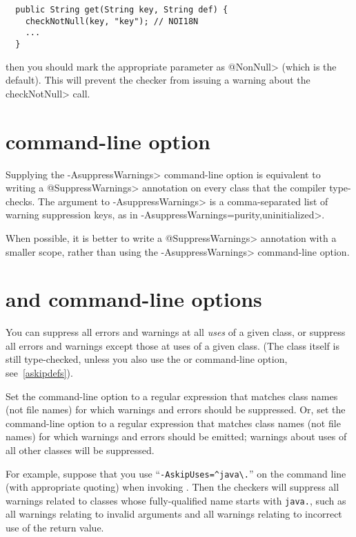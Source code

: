 \begin{Verbatim}
  public String get(String key, String def) {
    checkNotNull(key, "key"); // NOI18N
    ...
  }
\end{Verbatim}

\noindent
then you should mark the appropriate parameter as \<@NonNull> (which is the
default).  This will prevent the checker from issuing a warning about the
\<checkNotNull> call.



\section{ command-line option\label{suppresswarnings-command-line}}

Supplying the \<-AsuppressWarnings> command-line option is equivalent to
writing a \<@SuppressWarnings> annotation on every class that the compiler
type-checks.  The argument to \<-AsuppressWarnings> is a comma-separated
list of warning suppression keys, as in
\<-AsuppressWarnings=purity,uninitialized>.

When possible, it is better to write a \<@SuppressWarnings> annotation with a
smaller scope, rather than using the \<-AsuppressWarnings> command-line option.


\section{ and  command-line options\label{askipuses}}

You can suppress all errors and warnings at all \emph{uses} of a given
class, or suppress all errors and warnings except those at uses of a given
class.  (The class itself is still type-checked, unless you also use
the  or  command-line option, see~\ref{askipdefs}).

Set the  command-line option to a
regular expression that matches class names (not file names) for which warnings and errors
should be suppressed.
Or, set the  command-line option to a
regular expression that matches class names (not file names) for which warnings and errors
should be emitted; warnings about uses of all other classes will be suppressed.

For example, suppose that you use
``{\codesize\verb|-AskipUses=^java\.|}'' on the command line
(with appropriate quoting) when invoking
.  Then the checkers will suppress all warnings related to
classes whose fully-qualified name starts with \codesize\verb|java.|, such
as all warnings relating to invalid arguments and all warnings relating to
incorrect use of the return value.


